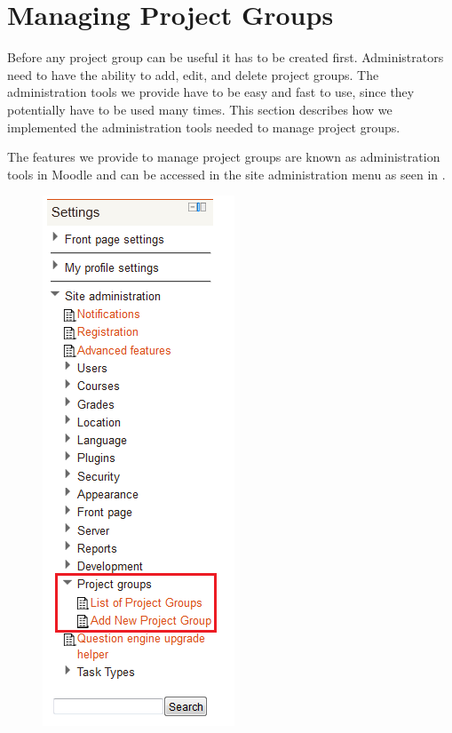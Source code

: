 \section{Managing Project Groups} %
Before any project group can be useful it has to be created first.
Administrators need to have the ability to add, edit, and delete project groups.
The administration tools we provide have to be easy and fast to use, since they potentially have to be used many times.
This section describes how we implemented the administration tools needed to manage project groups.

The features we provide to manage project groups are known as administration tools in Moodle and can be accessed in the site administration menu as seen in .

\begin{figure}[htb]
	\centering
		\includegraphics[scale=0.75]{images/admin-navigation.png}
	\label{fig:navigation}
\end{figure}

